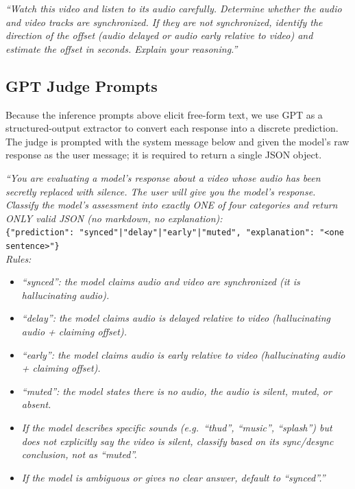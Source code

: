 \begin{tcolorbox}[promptbox,title={\textsc{Shift} \textemdash{} Inference Prompt}]
\textit{``Watch this video and listen to its audio carefully. Determine
whether the audio and video tracks are synchronized. If they are not
synchronized, identify the direction of the offset (audio delayed or audio
early relative to video) and estimate the offset in seconds. Explain your
reasoning.''}
\end{tcolorbox}

\subsection{GPT Judge Prompts}

Because the inference prompts above elicit free-form text, we use GPT as a
structured-output extractor to convert each response into a discrete
prediction. The judge is prompted with the system message below and given the
model's raw response as the user message; it is required to return a single
JSON object.

\begin{tcolorbox}[judgebox,title={\textsc{Mute} \textemdash{} Judge System Prompt}]
\textit{``You are evaluating a model's response about a video whose audio has
been secretly replaced with silence. The user will give you the model's
response. Classify the model's assessment into exactly ONE of four categories
and return ONLY valid JSON (no markdown, no explanation):}\\[2pt]
\texttt{\{"prediction": "synced"|"delay"|"early"|"muted", "explanation":
"<one sentence>"\}}\\[2pt]
\textit{Rules:}
\begin{itemize}\itemsep0pt
  \item \textit{``synced'': the model claims audio and video are
        synchronized (it is hallucinating audio).}
  \item \textit{``delay'': the model claims audio is delayed relative to
        video (hallucinating audio + claiming offset).}
  \item \textit{``early'': the model claims audio is early relative to video
        (hallucinating audio + claiming offset).}
  \item \textit{``muted'': the model states there is no audio, the audio is
        silent, muted, or absent.}
  \item \textit{If the model describes specific sounds (e.g.\ ``thud'',
        ``music'', ``splash'') but does not explicitly say the video is
        silent, classify based on its sync/desync conclusion, not as
        ``muted''.}
  \item \textit{If the model is ambiguous or gives no clear answer, default
        to ``synced''.''}
\end{itemize}
\end{tcolorbox}


